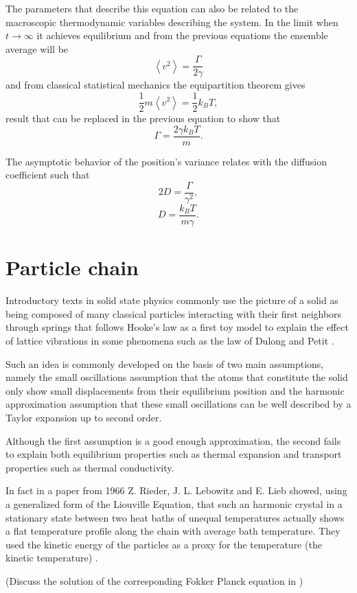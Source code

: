 The parameters that describe this equation can also be related to the macroscopic thermodynamic variables describing the system. In the limit when $t \rightarrow \infty$ it achieves equilibrium and from the previous equations the ensemble average will be
$$ \left< v^{2} \right> = \frac{\Gamma}{2\gamma} $$
and from classical statistical mechanics the equipartition theorem gives
$$ \frac{1}{2} m \left< v^{2} \right> = \frac{1}{2}k_{B}T, $$
result that can be replaced in the previous equation to show that
$$ \Gamma = \frac{2\gamma k_{B}T}{m}.$$

The asymptotic behavior of the position's variance relates with the diffusion coefficient such that
$$ 2D = \frac{\Gamma}{\gamma^2}, $$
$$ D = \frac{k_{B}T}{m\gamma}. $$

\section{Particle chain}

Introductory texts in solid state physics commonly use the picture of a solid as being composed of many classical particles interacting with their first neighbors through springs that follows Hooke's law as a first toy model to explain the effect of lattice vibrations in some phenomena such as the law of Dulong and Petit \cite{ashcroftSolidState1976}.

Such an idea is commonly developed on the basis of two main assumptions, namely the small oscillations assumption that the atoms that constitute the solid only show small displacements from their equilibrium position and the harmonic approximation assumption that these small oscillations can be well described by a Taylor expansion up to second order.

Although the first assumption is a good enough approximation, the second fails to explain both equilibrium properties such as thermal expansion and transport properties such as thermal conductivity.

In fact in a paper from 1966 Z. Rieder, J. L. Lebowitz and E. Lieb showed, using a generalized form of the Liouville Equation, that such an harmonic crystal in a stationary state between two heat baths of unequal temperatures actually shows a flat temperature profile along the chain with average bath temperature. They used the kinetic energy of the particles as a proxy for the temperature (the kinetic temperature) \cite{riederPropertiesHarmonic1967}.

(Discuss the solution of the corresponding Fokker Planck equation in \cite{lepriThermalConduction2003})


